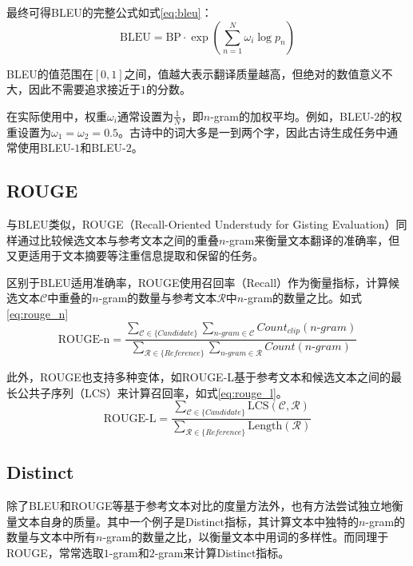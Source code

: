 最终可得BLEU的完整公式如式\eqref{eq:bleu}：
\begin{equation}
    \mathrm{BLEU}=\mathrm{BP}\cdot\exp\left(\sum^N_{n=1} \omega_i\log p_n\right) \label{eq:bleu}
\end{equation}

BLEU的值范围在$[0,1]$之间，值越大表示翻译质量越高，但绝对的数值意义不大，因此不需要追求接近于$1$的分数。

在实际使用中，权重$\omega_i$通常设置为$\frac{1}{N}$，即$n$-gram的加权平均。例如，BLEU-$2$的权重设置为$\omega_1=\omega_2=0.5$。古诗中的词大多是一到两个字，因此古诗生成任务中通常使用BLEU-$1$和BLEU-$2$。

\subsection{ROUGE}
与BLEU类似，ROUGE（Recall-Oriented Understudy for Gisting Evaluation）同样通过比较候选文本与参考文本之间的重叠$n$-gram来衡量文本翻译的准确率，但又更适用于文本摘要等注重信息提取和保留的任务。\cite{linROUGEPackageAutomatic2004}

区别于BLEU适用准确率，ROUGE使用召回率（Recall）作为衡量指标，计算候选文本$\mathcal C$中重叠的$n$-gram的数量与参考文本$\mathcal R$中$n$-gram的数量之比。如式\eqref{eq:rouge_n}
\begin{equation}
    \text{ROUGE-n} = \frac{\sum_{\mathcal C \in\{Candidate\}} \sum_{n\mbox{-}gram\in\mathcal C} Count_{clip}(n\mbox{-}gram)}{\sum_{\mathcal R \in\{Reference\}} \sum_{n\mbox{-}gram\in\mathcal R} Count(n\mbox{-}gram)} \label{eq:rouge_n}
\end{equation}

此外，ROUGE也支持多种变体，如ROUGE-L基于参考文本和候选文本之间的最长公共子序列（LCS）来计算召回率，如式\eqref{eq:rouge_l}。
\begin{equation}
    \text{ROUGE-L} = \frac{\sum_{\mathcal C \in\{Candidate\}} \text{LCS}(\mathcal C,\mathcal R)}{\sum_{\mathcal R \in\{Reference\}}\text{Length}(\mathcal R)} \label{eq:rouge_l}
\end{equation}

\subsection{Distinct}
除了BLEU和ROUGE等基于参考文本对比的度量方法外，也有方法尝试独立地衡量文本自身的质量。其中一个例子是Distinct指标，其计算文本中独特的$n$-gram的数量与文本中所有$n$-gram的数量之比，以衡量文本中用词的多样性。而同理于ROUGE，常常选取$1$-gram和$2$-gram来计算Distinct指标。\cite{liDiversityPromotingObjectiveFunction2016,liGeneratingClassicalChinese2018a} 


